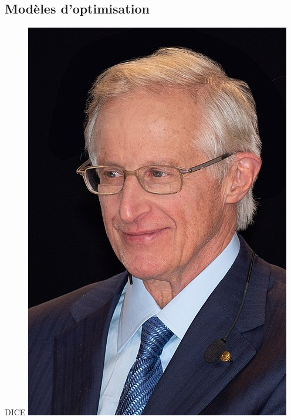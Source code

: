 \documentclass{beamer}
\begin{document}
\subsection{Modèles d'optimisation}
\begin{frame}{DICE}
\includegraphics[scale=0.2]{images/Nordhaus.jpg}
\end{frame}
\end{document}
